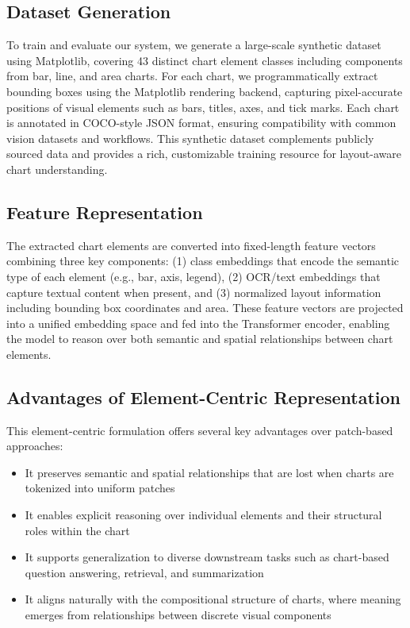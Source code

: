 \documentclass[11pt]{article}
\begin{document}
\subsection*{Dataset Generation}

To train and evaluate our system, we generate a large-scale synthetic dataset using Matplotlib, covering 43 distinct chart element classes including components from bar, line, and area charts. For each chart, we programmatically extract bounding boxes using the Matplotlib rendering backend, capturing pixel-accurate positions of visual elements such as bars, titles, axes, and tick marks. Each chart is annotated in COCO-style JSON format, ensuring compatibility with common vision datasets and workflows. This synthetic dataset complements publicly sourced data and provides a rich, customizable training resource for layout-aware chart understanding.

\subsection*{Feature Representation}

The extracted chart elements are converted into fixed-length feature vectors combining three key components: (1) class embeddings that encode the semantic type of each element (e.g., bar, axis, legend), (2) OCR/text embeddings that capture textual content when present, and (3) normalized layout information including bounding box coordinates and area. These feature vectors are projected into a unified embedding space and fed into the Transformer encoder, enabling the model to reason over both semantic and spatial relationships between chart elements.

\subsection*{Advantages of Element-Centric Representation}

This element-centric formulation offers several key advantages over patch-based approaches:
\begin{itemize}
    \item It preserves semantic and spatial relationships that are lost when charts are tokenized into uniform patches
    \item It enables explicit reasoning over individual elements and their structural roles within the chart
    \item It supports generalization to diverse downstream tasks such as chart-based question answering, retrieval, and summarization
    \item It aligns naturally with the compositional structure of charts, where meaning emerges from relationships between discrete visual components
\end{itemize}
\end{document}
